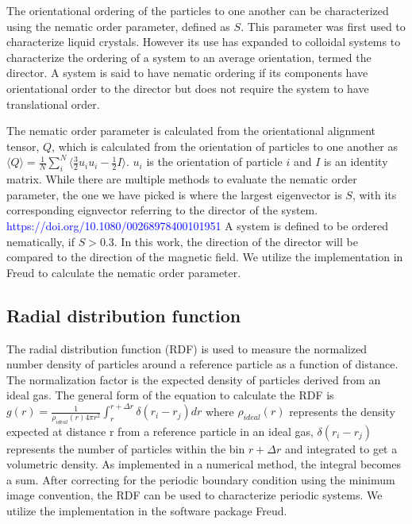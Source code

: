 The orientational ordering of the particles to one another can be characterized using the nematic order parameter, defined as $S$. This parameter was first used to characterize liquid crystals. However its use has expanded to colloidal systems to characterize the ordering of a system to an average orientation, termed the director. A system is said to have nematic ordering if its components have orientational order to the director but does not require the system to have translational order.

The nematic order parameter is calculated from the orientational alignment tensor, $Q$, which is calculated from the orientation of particles to one another as $\langle Q \rangle = \frac{1}{N} \sum_{i}^{N} \langle \frac{3}{2}u_i u_i - \frac{1}{2}I \rangle$. $u_i$ is the orientation of particle $i$ and $I$ is an identity matrix. \cite{veerman_phase_1992} While there are multiple methods to evaluate the nematic order parameter, the one we have picked is where the largest eigenvector is $S$, with its corresponding eignvector referring to the director of the system. \cite{veerman_phase_1992} \textcolor{blue}{https://doi.org/10.1080/00268978400101951} A system is defined to be ordered nematically, if $S > 0.3$. In this work, the direction of the director will be compared to the direction of the magnetic field. We utilize the implementation in Freud to calculate the nematic order parameter.

\subsection{Radial distribution function}

The radial distribution function (RDF) is used to measure the normalized number density of particles around a reference particle as a function of distance. The normalization factor is the expected density of particles derived from an ideal gas. The general form of the equation to calculate the RDF is $g(r) = \frac{1}{\rho_{ideal}(r) 4\pi r^2} \int_{r}^{r+\Delta r} \delta(r_{i} - r_{j}) dr$ where $\rho_{ideal}(r)$ represents the density expected at distance r from a reference particle in an ideal gas, $\delta(r_{i} - r_{j})$ represents the number of particles within the bin $r + \Delta r$ and integrated to get a volumetric density. As implemented in a numerical method, the integral becomes a sum. After correcting for the periodic boundary condition using the minimum image convention, the RDF can be used to characterize periodic systems. We utilize the implementation in the software package Freud. 

